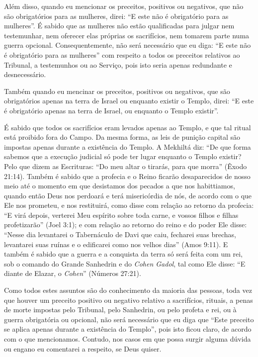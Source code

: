Além disso, quando eu mencionar os preceitos, positivos ou negativos,
que não são obrigatórios para as mulheres, direi: ``E este não é
obrigatório para as mulheres''. É sabido que as mulheres não estão
qualificadas para julgar nem testemunhar, nem oferecer elas próprias os
sacrifícios, nem tomarem parte numa guerra opcional. Consequentemente,
não será necessário que eu diga: ``E este não é obrigatório para as
mulheres'' com respeito a todos os preceitos relativos ao Tribunal, a
testemunhos ou ao Serviço, pois isto seria apenas redundante e
desnecessário.

Também quando eu mencinar os preceitos, positivos ou negativos, que são
obrigatórios apenas na terra de Israel ou enquanto existir o Templo,
direi: ``E este é obrigatório apenas na terra de Israel, ou enquanto o
Templo existir''.

É sabido que todos os sacrifícios eram levados apenas ao Templo, e que
tal ritual está proibido fora do Campo. Da mesma forma, as leis de
punição capital são impostas apenas durante a existência do Templo. A
Mekhiltá diz: ``De que forma sabemos que a execução judicial só pode ter
lugar enquanto o Templo existir? Pelo que dizem as Escrituras: ``Do meu
altar o tirarás, para que morra'' (Êxodo 21:14). Também é sabido que a
profecia e o Reino ficarão desaparecidos de nosso meio até o momento em
que desistamos dos pecados a que nos habittiamos, quando então Deus nos
perdoará e terá misericórdia de nós, de acordo com o que Ele nos
prometeu, e nos restituirá, como disse com relação ao retorno da
profecia: ``E virá depois, verterei Meu espírito sobre toda carne, e
vossos filhos e filhas profetizarão'' (Joel 3:1); e com relação ao
retorno do reino e do poder Ele disse: ``Nesse dia levantarei o
Tabernáculo de Davi que caiu, fecharei suas brechas, levantarei suas
ruínas e o edificarei como nos velhos dias'' (Amos 9:11). E também é
sabido que a guerra e a conquista da terra só será feita com um rei, sob
o comando do Grande Sanhedrin e do \textit{Cohen Gadol}, tal como Ele disse:
``E diante de Elazar, o \textit{Cohen}'' (Números 27:21).


Como todos estes assuntos são do conhecimento da maioria das pessoas,
toda vez que houver um preceito positivo ou negativo relativo a
sacrifícios, rituais, a penas de morte impostas pelo Tribunal, pelo
Sanhedrin, ou pelo profeta e rei, ou à guerra obrigatória ou opcional,
não será necessário que eu diga que ``Este preceito se aplica apenas
durante a existência do Templo'', pois isto ficou claro, de acordo com o
que mencionamos. Contudo, nos casos em que possa surgir alguma dúvida ou
engano eu comentarei a respeito, se Deus quiser.

